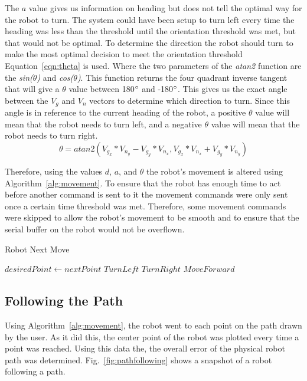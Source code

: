 \documentclass[12pt,american]{report}
\begin{document}
The $a$ value gives us information on heading but does not tell the optimal way for the robot to turn. The system could have been setup to turn left every time the heading was less than the threshold until the orientation threshold was met, but that would not be optimal.  To determine the direction the robot should turn to make the most optimal decision to meet the orientation threshold Equation~\ref{eqn:theta} is used. Where the two parameters of the \textit{atan2} function are the \textit{sin($\theta$)} and \textit{cos($\theta$)}.  This function returns the four quadrant inverse tangent that will give a $\theta$ value between 180$\degree$ and -180$\degree$.  This gives us the exact angle between the $V_g$ and $V_n$ vectors to determine which direction to turn.  Since this angle is in reference to the current heading of the robot, a positive $\theta$ value will mean that the robot needs to turn left, and a negative $\theta$ value will mean that the robot needs to turn right. 
\begin{equation}
\theta = atan2(V_{g_{x}}*V_{n_{y}}-V_{g_{y}}*V_{n_{x}}, V_{g_{x}}*V_{n_{x}}+V_{g_{y}}*V_{n_{y}}) 
\label{eqn:theta}
\end{equation}

Therefore, using the values $d$, $a$, and $\theta$ the robot's movement is altered using Algorithm~\ref{alg:movement}. To ensure that the robot has enough time to act before another command is sent to it the movement commands were only sent once a certain time threshold was met. Therefore, some movement commands were skipped to allow the robot's movement to be smooth and to ensure that the serial buffer on the robot would not be overflown. 
\begin{algorithm}
\caption{Robot Next Move}
\label{alg:movement}
\begin{algorithmic} 
\State $desiredPoint \leftarrow nextPoint$
\State $Turn Left$
\Else
\State $Turn Right$
\EndIf
{}
\State $Move Forward$
\EndIf
\end{algorithmic}
\end{algorithm}


\subsection{Following the Path} 

Using Algorithm~\ref{alg:movement}, the robot went to each point on the path drawn by the user. As it did this, the center point of the robot was plotted every time a point was reached. Using this data the, the overall error of the physical robot path was determined. Fig.~\ref{fig:pathfollowing} shows a snapshot of a robot following a path. 
\end{document}
